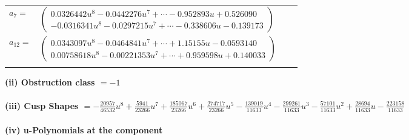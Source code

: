 \documentclass[1p]{elsarticle_modified}
\theoremstyle{definition}
\begin{document}
\begin{tabular}{m{7pt} m{180pt} m{7pt} m{180pt} }
\flushright $a_{7}=$&$\begin{pmatrix}0.0326442 u^{8}-0.0442276 u^{7}+\cdots-0.952893 u+0.526090\\-0.0316341 u^{8}-0.0297215 u^{7}+\cdots-0.338606 u-0.139173\end{pmatrix}$ \\
\flushright $a_{12}=$&$\begin{pmatrix}0.0343097 u^{8}-0.0464841 u^{7}+\cdots+1.15155 u-0.0593140\\0.00758618 u^{8}-0.00221353 u^{7}+\cdots+0.959598 u+0.140033\end{pmatrix}$\\&\end{tabular}
\flushleft \textbf{(ii) Obstruction class $= -1$}\\~\\
\flushleft \textbf{(iii) Cusp Shapes $= -\frac{20957}{46532} u^8+\frac{5941}{23266} u^7+\frac{185067}{23266} u^6+\frac{274717}{23266} u^5-\frac{139019}{11633} u^4-\frac{299261}{11633} u^3-\frac{57101}{11633} u^2+\frac{28694}{11633} u-\frac{223158}{11633}$}\\~\\
\newpage\renewcommand{\arraystretch}{1}
\flushleft \textbf{(iv) u-Polynomials at the component}\newline \\
\end{document}
